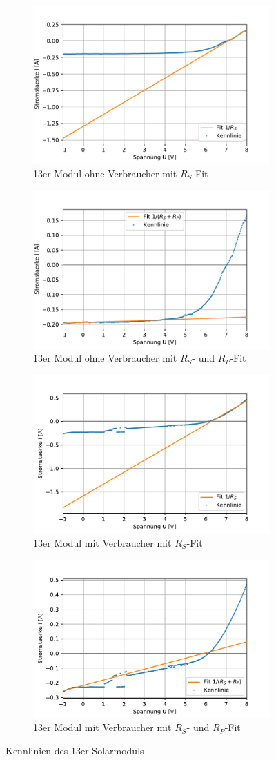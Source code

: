 \documentclass[slug=SZ, room=Hermann-Krone-Bau\,\ Labor\ 1.25, supervisor=Martin\ Kroll]{../../Lab_Report_LaTeX/lab_report}
\begin{document}
\begin{figure}[H]\centering
	\begin{subfigure}[b]{1\textwidth}\centering
		\includegraphics[width=.45\columnwidth]{figs/python/huge_hell_rs.pdf}
		\caption{13er Modul ohne Verbraucher mit \(R_S\)-Fit}
		\label{diag:hugehellrs}
	\end{subfigure}
\begin{subfigure}[b]{1\textwidth}\centering
	\includegraphics[width=.45\columnwidth]{figs/python/huge_hell_rsrp.pdf}
	\caption{13er Modul ohne Verbraucher mit \(R_S\)- und \(R_P\)-Fit}
	\label{diag:hugehellrsrp}
\end{subfigure}
	\begin{subfigure}[b]{1\textwidth}\centering
		\includegraphics[width=.45\columnwidth]{figs/python/huge_verbraucher_rs.pdf}
		\caption{13er Modul mit Verbraucher mit \(R_S\)-Fit}
		\label{diag:hugeverbrrs}
	\end{subfigure}
\begin{subfigure}[b]{1\textwidth}\centering
	\includegraphics[width=.45\columnwidth]{figs/python/huge_verbraucher_rsrp.pdf}
	\caption{13er Modul mit Verbraucher mit \(R_S\)- und \(R_P\)-Fit}
	\label{diag:hugeverbrrsrp}
\end{subfigure}
	\caption{Kennlinien des 13er Solarmoduls}
	\label{fig:huge}
\end{figure}
\end{document}
